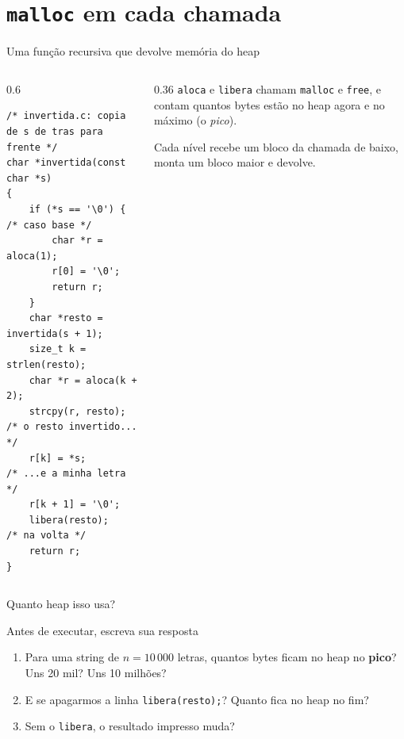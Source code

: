\documentclass[aspectratio=169]{beamer}
\begin{document}
\section{\texttt{malloc} em cada chamada}

\begin{frame}[fragile]{Uma função recursiva que devolve memória do heap}
  \begin{columns}[c]
    \begin{column}{0.6\textwidth}
\begin{lstlisting}[style=codC]
/* invertida.c: copia de s de tras para frente */
char *invertida(const char *s)
{
    if (*s == '\0') {              /* caso base */
        char *r = aloca(1);
        r[0] = '\0';
        return r;
    }
    char *resto = invertida(s + 1);
    size_t k = strlen(resto);
    char *r = aloca(k + 2);
    strcpy(r, resto);   /* o resto invertido... */
    r[k] = *s;          /* ...e a minha letra   */
    r[k + 1] = '\0';
    libera(resto);      /* na volta */
    return r;
}
\end{lstlisting}
    \end{column}
    \begin{column}{0.36\textwidth}
      \small
      \texttt{aloca} e \texttt{libera} chamam \texttt{malloc} e
      \texttt{free}, e contam quantos bytes estão no heap agora e no
      máximo (o \emph{pico}).

      \medskip
      Cada nível recebe um bloco da chamada de baixo, monta um bloco maior e
      devolve.
    \end{column}
  \end{columns}
\end{frame}

\begin{frame}{Quanto heap isso usa?}
  \begin{block}{Antes de executar, escreva sua resposta}
    \begin{enumerate}
      \item Para uma string de $n = 10\,000$ letras, quantos bytes ficam no
        heap no \textbf{pico}? Uns 20 mil? Uns 10 milhões?
      \item E se apagarmos a linha \texttt{libera(resto);}? Quanto fica no
        heap no fim?
      \item Sem o \texttt{libera}, o resultado impresso muda?
    \end{enumerate}
  \end{block}
\end{frame}
\end{document}
